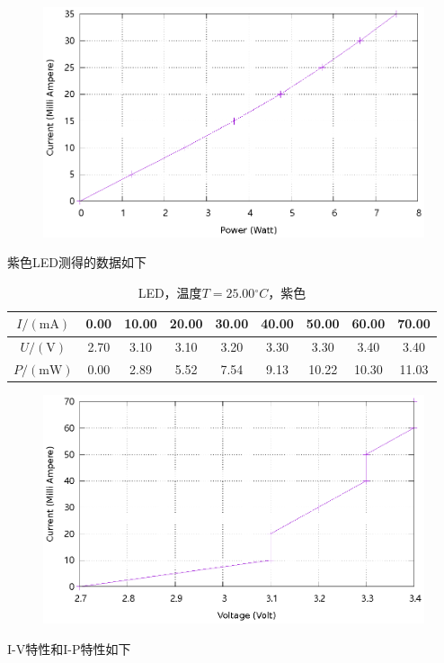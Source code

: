 \documentclass{ctexart}
\newcommand{\si}[1]{\mathrm{#1}}
\begin{document}
\begin{figure}[H]
  \centering
  \includegraphics[width=0.8\linewidth]{optics-figures/led-pc-1.gnuplot}
\end{figure}
  
\newpage
紫色LED测得的数据如下

\begin{table}[H]
  \centering
  \begin{tabular}{|c|c|c|c|c|c|c|c|c|}
    \hline
    $I/(\si{mA})$   & 0.00 & 10.00 & 20.00 & 30.00 & 40.00 & 50.00 & 60.00 & 70.00 \\\hline
    $U / (\si{V})$  & 2.70 & 3.10 & 3.10 & 3.20 & 3.30 & 3.30 & 3.40 & 3.40 \\\hline
    $P / (\si{mW})$ & 0.00 & 2.89 & 5.52 & 7.54 & 9.13 & 10.22 & 10.30 & 11.03 \\\hline
  \end{tabular}
  \caption{LED，温度$T=25.00{}^{\circ}C$，紫色}
\end{table}

\begin{figure}[H]
  \centering
  \includegraphics[width=0.8\linewidth]{optics-figures/led-vc-2.gnuplot}
\end{figure}

I-V特性和I-P特性如下
\end{document}
